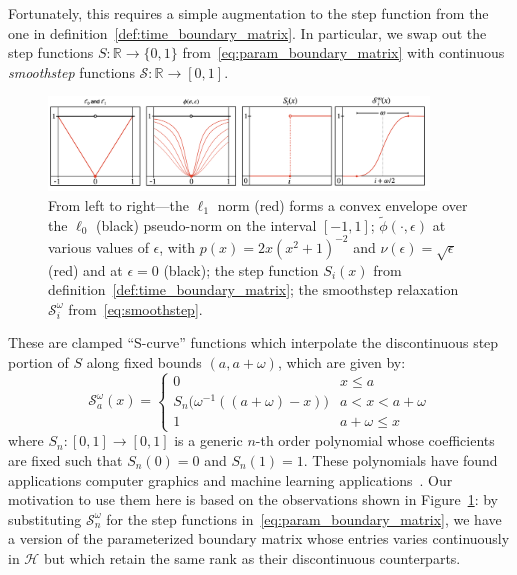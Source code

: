 \documentclass[10pt]{article}
\numberwithin{equation}{section}
\newcommand{\+}{%
	\raisebox{0.18ex}{\scaleobj{0.55}{+}}
}
\theoremstyle{definition}
\begin{document}
Fortunately, this requires a simple augmentation to the step function from the one in definition~\ref{def:time_boundary_matrix}. In particular, we swap out the step functions $S : \mathbb{R} \to \{ 0, 1\}$ from~\eqref{eq:param_boundary_matrix} with continuous \emph{smoothstep} functions $\mathcal{S}: \mathbb{R} \to [0, 1]$. 
\begin{figure}
\centering
	\includegraphics[width=0.90\textwidth]{cont_relax}
	\caption{From left to right---the $\ell_1$ norm (red) forms a convex envelope over the $\ell_0$ (black) pseudo-norm on the interval $[-1, 1]$; 
	$\tilde{\phi}(\cdot, \epsilon)$ at various values of $\epsilon$, with $p(x) = 2x (x^2 + 1)^{-2}$ and $\nu(\epsilon) = \sqrt{\epsilon}$ (red) and at $\epsilon = 0$ (black); 
	the step function $S_i(x)$ from definition~\ref{def:time_boundary_matrix}; 
	the smoothstep relaxation $\mathcal{S}_i^{\omega}$ from~\eqref{eq:smoothstep}.
	}
	\label{fig:smoothstep}
\end{figure}
These are clamped ``S-curve'' functions which interpolate the discontinuous step portion of $S$ along fixed bounds $(a,a+\omega)$, which are given by:  
\begin{equation}\label{eq:smoothstep}
\mathcal{S}_a^{\omega} (x) = \begin{cases}
	0 & x \leq a \\
	S_n\big( \omega^{-1}((a + \omega) - x) \big) & a < x < a + \omega \\
	1 & a + \omega \leq x
\end{cases}
\end{equation} 
where $S_n: [0,1] \to [0,1]$ is a generic $n$-th order polynomial whose coefficients are fixed such that $S_n(0) = 0$ and $S_n(1) = 1$.
These polynomials have found applications computer graphics and machine learning applications~\cite{}. 
Our motivation to use them here is based on the observations shown in Figure~\ref{fig:smoothstep}: by substituting $\mathcal{S}_n^{\omega}$ for the step functions 	in~\eqref{eq:param_boundary_matrix}, we have a version of the parameterized boundary matrix whose entries varies continuously in $\mathcal{H}$ but which retain the same rank as their discontinuous counterparts. 
\end{document}
